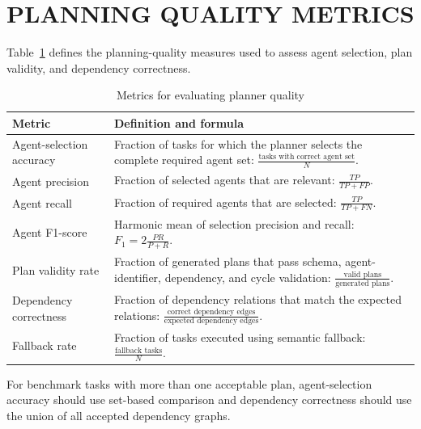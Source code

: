 \section{\uppercase{Planning Quality Metrics}}
Table~\ref{tab:planning-metrics} defines the planning-quality measures used to assess agent selection, plan validity, and dependency correctness.
\begin{table}[H]
\centering
\caption{Metrics for evaluating planner quality}
\label{tab:planning-metrics}
\begin{tabularx}{\textwidth}{|>{\centering\arraybackslash}p{}|>{\centering\arraybackslash}X|}
\hline
\textbf{Metric} & \textbf{Definition and formula} \\ \hline
Agent-selection accuracy & Fraction of tasks for which the planner selects the complete required agent set: $\frac{\text{tasks with correct agent set}}{N}$. \\ \hline
Agent precision & Fraction of selected agents that are relevant: $\frac{TP}{TP+FP}$. \\ \hline
Agent recall & Fraction of required agents that are selected: $\frac{TP}{TP+FN}$. \\ \hline
Agent F1-score & Harmonic mean of selection precision and recall: $F_1=2\frac{PR}{P+R}$. \\ \hline
Plan validity rate & Fraction of generated plans that pass schema, agent-identifier, dependency, and cycle validation: $\frac{\text{valid plans}}{\text{generated plans}}$. \\ \hline
Dependency correctness & Fraction of dependency relations that match the expected relations: $\frac{\text{correct dependency edges}}{\text{expected dependency edges}}$. \\ \hline
Fallback rate & Fraction of tasks executed using semantic fallback: $\frac{\text{fallback tasks}}{N}$. \\ \hline
\end{tabularx}
\end{table}

For benchmark tasks with more than one acceptable plan, agent-selection accuracy should use set-based comparison and dependency correctness should use the union of all accepted dependency graphs.

\clearpage
